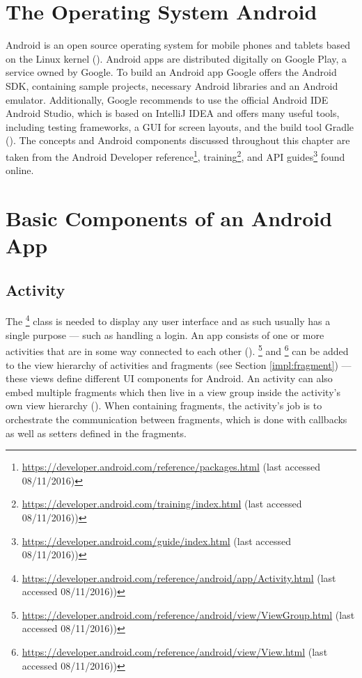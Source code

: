 \section{The Operating System Android}
Android is an open source operating system for mobile phones and tablets based on the Linux kernel (\cite{androiddef}). Android apps are distributed digitally on Google Play, a service owned by Google. To build an Android app Google offers the Android \gls{SDK}, containing sample projects, necessary Android libraries and an Android emulator. Additionally, Google recommends to use the official Android \gls{IDE} Android Studio, which is based on IntelliJ IDEA and offers many useful tools, including testing frameworks, a \gls{GUI} for screen layouts, and the build tool Gradle (\cite{androidstudio}). The concepts and Android components discussed throughout this chapter are taken from the Android Developer reference\footnote{\url{https://developer.android.com/reference/packages.html} (last accessed 08/11/2016)}, training\footnote{\url{https://developer.android.com/training/index.html} (last accessed 08/11/2016))}, and \gls{API} guides\footnote{\url{https://developer.android.com/guide/index.html} (last accessed 08/11/2016))} found online.

\section{Basic Components of an Android App}

\subsection{Activity}
The \footnote{\url{https://developer.android.com/reference/android/app/Activity.html} (last accessed 08/11/2016))} class is needed to display any user interface and as such usually has a single purpose --- such as handling a login. An app consists of one or more activities that are in some way connected to each other (\cite{activities_in_app}). \footnote{\url{https://developer.android.com/reference/android/view/ViewGroup.html} (last accessed 08/11/2016))} and \footnote{\url{https://developer.android.com/reference/android/view/View.html} (last accessed 08/11/2016))} can be added to the view hierarchy of activities and fragments (see Section \ref{impl:fragment}) --- these views define different UI components for Android. An activity can also embed multiple fragments which then live in a view group inside the activity's own view hierarchy (\cite{androidfragment}). When containing fragments, the activity’s job is to orchestrate the communication between fragments, which is done with callbacks as well as setters defined in the fragments. 


